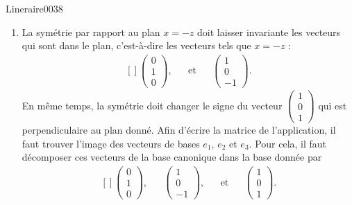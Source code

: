 \begin{corrige}{Lineraire0038}

	\begin{enumerate}

		\item
			


	La symétrie par rapport au plan $x=-z$ doit laisser invariante les vecteurs qui sont dans le plan, c'est-à-dire les vecteurs tels que $x=-z$ :
	\begin{equation}
		\begin{aligned}[]
			\begin{pmatrix}
				0	\\ 
				1	\\ 
				0	
			\end{pmatrix},&&\text{et}&&\begin{pmatrix}
				1	\\ 
				0	\\ 
				-1	
			\end{pmatrix}.
		\end{aligned}
	\end{equation}
	En même temps, la symétrie doit changer le signe du vecteur $\begin{pmatrix}
		1	\\ 
		0	\\ 
		1	
	\end{pmatrix}$ qui est perpendiculaire au plan donné. Afin d'écrire la matrice de l'application, il faut trouver l'image des vecteurs de bases $e_1$, $e_2$ et $e_3$. Pour cela, il faut décomposer ces vecteurs de la base canonique dans la base donnée par
	\begin{equation}
		\begin{aligned}[]
			\begin{pmatrix}
				0	\\ 
				1	\\ 
				0	
			\end{pmatrix},&&\begin{pmatrix}
				1	\\ 
				0	\\ 
				-1	
			\end{pmatrix},&&\text{et}&&\begin{pmatrix}
				1	\\ 
				0	\\ 
				1	
			\end{pmatrix}.

\end{aligned}
\end{equation}
\end{enumerate}
\end{corrige}
